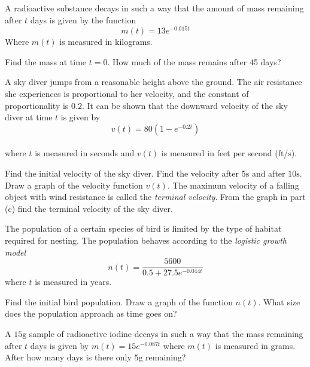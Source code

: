 \begin{Exercise}[title={Modelling},label=exModelling]
	\Question A radioactive substance decays in such a way that the amount of mass remaining after $t$ days is given by the function
	\begin{equation*}m (t) =13 e^{ -0.015 t}
	\end{equation*} Where $m (t)$ is measured in kilograms. 
	\begin{tasks}
		\task Find the mass at time $t =0$.%
		\task How much of the mass remains after 45 days?%
	\end{tasks}
	
	\Question A sky diver jumps from a reasonable height above the ground. The air resistance she experiences is proportional to her velocity, and the constant of proportionality is $0.2$. It can be shown that the downward velocity of the sky diver at time $t$ is given by
	\begin{equation*}v (t) =80 \left (1 -e^{ -0.2 t}\right )
	\end{equation*} \\\relax where $t$ is measured in seconds and $v (t)$ is measured in feet per second ($\mbox{ft}$/$\mbox{s}$).
	\begin{tasks}
		\task Find the initial velocity of the sky diver.%
		\task Find the velocity after $5 \mbox{s}$ and after $10 \mbox{s}$. %
		\task Draw a graph of the velocity function $v (t)\text{.}$%
		\task The maximum velocity of a falling object with wind resistance is called the \emph{terminal velocity}. From the graph in part (c) find the terminal velocity of the sky diver. %
	\end{tasks}

\Question The population of a certain species of bird is limited by the type of habitat required for nesting. The population behaves according to the \emph{logistic growth model}
\begin{equation*}n (t) =\frac{5600}{0.5 +27.5 e^{ -0.044 t}}
\end{equation*}  where $t$ is measured in years.
	\begin{tasks}
	\task Find the initial bird population. %
	\task Draw a graph of the function $n (t)$.%
	\task What size does the population approach as time goes on?%
\end{tasks}

\Question A $15 \mbox{g}$ sample of radioactive iodine decays in such a way that the mass remaining after $t$ days is given by $m \left (t\right ) =15 e^{ -0.087 t}$ where $m (t)$ is measured in grams. After how many days is there only $5 \mbox{g}$ remaining? %


\end{Exercise}
